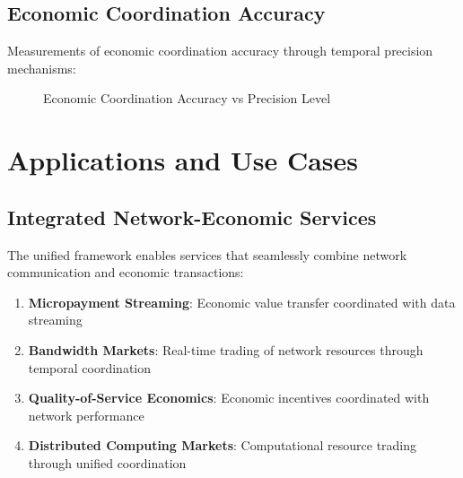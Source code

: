 \documentclass[12pt,a4paper]{article}
\begin{document}
\subsection{Economic Coordination Accuracy}

Measurements of economic coordination accuracy through temporal precision mechanisms:

\begin{figure}[htbp]
\centering
{}
\caption{Economic Coordination Accuracy vs Precision Level}
\end{figure}

\section{Applications and Use Cases}

\subsection{Integrated Network-Economic Services}

The unified framework enables services that seamlessly combine network communication and economic transactions:

\begin{enumerate}
\item \textbf{Micropayment Streaming}: Economic value transfer coordinated with data streaming
\item \textbf{Bandwidth Markets}: Real-time trading of network resources through temporal coordination
\item \textbf{Quality-of-Service Economics}: Economic incentives coordinated with network performance
\item \textbf{Distributed Computing Markets}: Computational resource trading through unified coordination
\end{enumerate}
\end{document}
